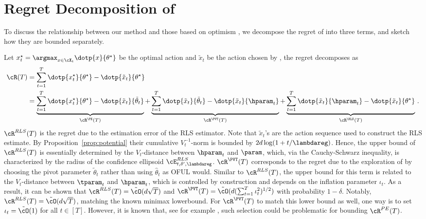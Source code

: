 



\section{Regret Decomposition of \POFUL{}}
\label{sec:regret_decomp}
To discuss the relationship between our method and those based on optimism \citep{abbasi2011improved,agrawal2013thompson,abeille2017linear}, we decompose the regret of \POFUL{} into three terms,  and sketch how they are bounded separately. 

Let  $x_t^\star = \argmax_{x\in \cX_t} \dotp{x}{\theta^\star}$ be the optimal action and $\tilde{x}_t$ be the action chosen by \POFUL{}, the regret decomposes as
%
\begin{align*}
\cR(T) & =\sum_{t=1}^T\dotp{x_t^\star}{ \theta^{\star}}-\dotp{\tilde{x}_t}{\theta^{\star}}\\
%
& = \underbrace{\sum_{t=1}^T\dotp{x_t^\star}{ \theta^{\star}}-\dotp{\tilde{x}_t}{\tilde{\theta}_t}}_{ \cR^{\PE}(T)}+ \underbrace{\sum_{t=1}^T\dotp{\tilde{x}_t}{\tilde{\theta}_t}-\dotp{\tilde{x}_t}{ \hparam_t}}_{\cR^{\PVT}(T)} +  \underbrace{\sum_{t=1}^T\dotp{\tilde{x}_t}{\hparam_t}-\dotp{\tilde{x}_t}{ \theta^{\star}}}_{\cR^{\RLS}(T)}\,.
\end{align*}
%
$\cR^{RLS}(T)$ is the regret due to the estimation error of the RLS estimator. Note that $\tilde{x}_t$'s are the action sequence used to construct the RLS estimate. By Proposition~\ref{prop:potential} their cumulative $V_t^{-1}$-norm is bounded by $2d\log(1+t/\lambdareg)$. Hence, the upper bound of $\cR^{RLS}(T)$ is essentially determined by the $V_t$-distance between $\hparam_t$ and $\param$, which, via the Cauchy-Schwarz inequality, is characterized by the radius of the confidence ellipsoid $\cE^{RLS}_{t,\delta^\prime, \lambdareg}$. $\cR^{\PVT}(T)$ corresponds to the regret due to the exploration of \POFUL{} by choosing the pivot parameter $\tilde{\theta}_t$ rather than using $\hat\theta_t$ as OFUL would. Similar to  $\cR^{RLS}(T)$, the upper bound for this term is related to the $V_t$-distance between $\tparam_t$ and $\hparam_t$, which is controlled by construction and depends on the inflation parameter $\iota_t$. As a result, it can be shown that 
$\cR^{RLS}(T)  = \tilde{\cO}(d\sqrt{T}) $ and $\cR^{\PVT}(T)  = \tilde{\cO}(d(\sum_{t = 1}^T \iota_{t}^2)^{1/2}) $ with probability $1-\delta$.  Notably, $\cR^{RLS}(T) = \tilde{\cO}(d\sqrt{T})  $, matching the known minimax lowerbound. For $\cR^{\PVT}(T)$ to match this lower bound as well, one way is to set $\iota_{t}=
\tilde{\cO}(1)$ for all $t\in[T]$. However, it is known that, see for example \citep{agrawal2013thompson,abeille2017linear,hamidi2020frequentist}, such selection could be problematic for bounding $\cR^{PE}(T)$.

